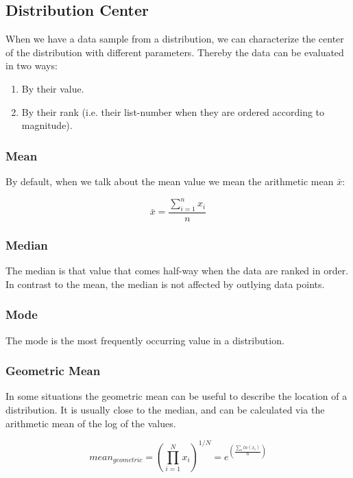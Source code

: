 \subsection{Distribution Center}

When we have a data sample from a distribution, we can characterize the center of the distribution with different parameters. Thereby the data can be evaluated in two ways:

\begin{enumerate}
  \item By their value.
  \item By their \gls{rank} (i.e. their list-number when they are ordered according to magnitude).
\end{enumerate}

\subsubsection{Mean} 
By default, when we talk about the mean value we mean the arithmetic mean $\bar{x}$:

\begin{equation}
  \bar{x} = \frac{{\sum\limits_{i = 1}^n {{x_i}} }}{n}
\end{equation}

\subsubsection{Median} 
The \gls{median} is that value that comes half-way when the data are ranked in order.
In contrast to the mean, the median is not affected by outlying data points.

\subsubsection{Mode} 
The \gls{mode} is the most frequently occurring value in a distribution.

\subsubsection{Geometric Mean}
In some situations the geometric mean can be useful to describe the location of a distribution. It is usually close to the median, and can be calculated via the arithmetic mean of the log of the values.

\begin{equation}\label{eq:geometricMean}
  mean_{geometric} =  \left(\prod_{i=1}^N x_i\right)^{1/N} = e^{\left( \frac{\sum_i ln(x_i)}{n} \right)}
\end{equation}

